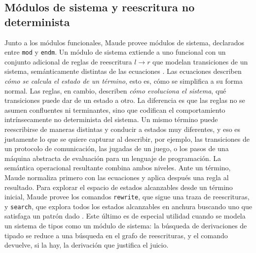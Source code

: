 \documentclass[a4paper,12pt]{report}
\theoremstyle{definition}
\theoremstyle{plain}
\theoremstyle{remark}
\begin{document}
\subsection{M\'odulos de sistema y reescritura no determinista}
Junto a los m\'odulos funcionales, Maude provee m\'odulos de sistema, declarados entre \texttt{mod} y \texttt{endm}. Un m\'odulo de sistema extiende a uno funcional con un conjunto adicional de reglas de reescritura $l \to r$ que modelan transiciones de un sistema, sem\'anticamente distintas de las ecuaciones \citep{clavel2007}. Las ecuaciones describen \textit{c\'omo se calcula el estado de un t\'ermino}, esto es, c\'omo se simplifica a su forma normal. Las reglas, en cambio, describen \textit{c\'omo evoluciona el sistema}, qu\'e transiciones puede dar de un estado a otro. La diferencia es que las reglas no se asumen confluentes ni terminantes, sino que codifican el comportamiento intr\'insecamente no determinista del sistema. Un mismo t\'ermino puede reescribirse de maneras distintas y conducir a estados muy diferentes, y eso es justamente lo que se quiere capturar al describir, por ejemplo, las transiciones de un protocolo de comunicaci\'on, las jugadas de un juego, o los pasos de una m\'aquina abstracta de evaluaci\'on para un lenguaje de programaci\'on.
\newline
\newline
La sem\'antica operacional resultante combina ambos niveles. Ante un t\'ermino, Maude normaliza primero con las ecuaciones y aplica despu\'es una regla al resultado. Para explorar el espacio de estados alcanzables desde un t\'ermino inicial, Maude provee los comandos \texttt{rewrite}, que sigue una traza de reescrituras, y \texttt{search}, que explora todos los estados alcanzables en anchura buscando uno que satisfaga un patr\'on dado \citep{duran2019}. Este \'ultimo es de especial utilidad cuando se modela un sistema de tipos como un m\'odulo de sistema: la b\'usqueda de derivaciones de tipado se reduce a una b\'usqueda en el grafo de reescrituras, y el comando devuelve, si la hay, la derivaci\'on que justifica el juicio.
\end{document}
